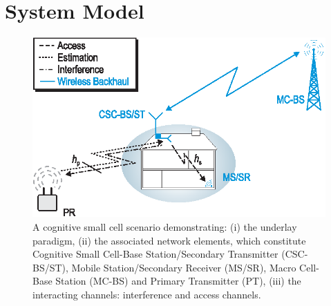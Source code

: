 \documentclass[12pt, draftclsnofoot, onecolumn]{IEEEtran}
\newcommand{\figscalet}{0.76 \columnwidth}
\newcommand{\figscalet}{0.41 \columnwidth}
\begin{document}
\section{System Model} \label{sec:sys_mod}
\begin{figure}[!t]
\vspace{-6mm}
\centering
\includegraphics[width = \figscalet]{figures/CR_Scenario_Underlay}
\vspace{-6mm}
\caption{A cognitive small cell scenario demonstrating: (i) the underlay paradigm, (ii) the associated network elements, which constitute Cognitive Small Cell-Base Station/Secondary Transmitter (CSC-BS/ST), Mobile Station/Secondary Receiver (MS/SR), Macro Cell-Base Station (MC-BS) and Primary Transmitter (PT), (iii) the interacting channels: interference and access channels.}
\label{fig:scenario}
\vspace{-4mm}
\end{figure}

\end{document}
